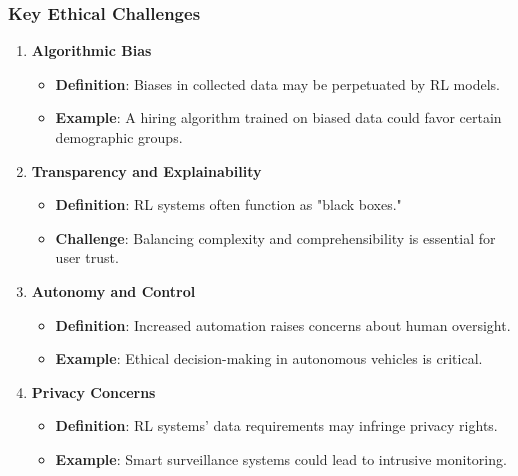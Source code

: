 \documentclass[aspectratio=169]{beamer}
\begin{document}
\begin{frame}
    \frametitle{Key Ethical Challenges}
    \begin{enumerate}
        \item \textbf{Algorithmic Bias}
            \begin{itemize}
                \item \textbf{Definition}: Biases in collected data may be perpetuated by RL models.
                \item \textbf{Example}: A hiring algorithm trained on biased data could favor certain demographic groups.
            \end{itemize}
        
        \item \textbf{Transparency and Explainability}
            \begin{itemize}
                \item \textbf{Definition}: RL systems often function as "black boxes."
                \item \textbf{Challenge}: Balancing complexity and comprehensibility is essential for user trust.
            \end{itemize}
        
        \item \textbf{Autonomy and Control}
            \begin{itemize}
                \item \textbf{Definition}: Increased automation raises concerns about human oversight.
                \item \textbf{Example}: Ethical decision-making in autonomous vehicles is critical.
            \end{itemize}
        
        \item \textbf{Privacy Concerns}
            \begin{itemize}
                \item \textbf{Definition}: RL systems' data requirements may infringe privacy rights.
                \item \textbf{Example}: Smart surveillance systems could lead to intrusive monitoring.
            \end{itemize}
    \end{enumerate}
\end{frame}
\end{document}
